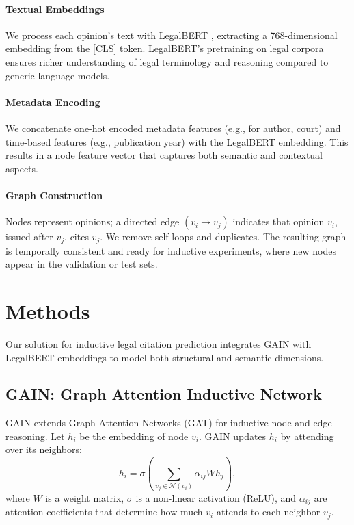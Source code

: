 \documentclass{article}
\begin{document}
\paragraph{Textual Embeddings}
We process each opinion’s text with LegalBERT \citep{chalkidis-etal-2020-legalbert}, extracting a 768-dimensional embedding from the [CLS] token. LegalBERT’s pretraining on legal corpora ensures richer understanding of legal terminology and reasoning compared to generic language models.

\paragraph{Metadata Encoding}
We concatenate one-hot encoded metadata features (e.g., for author, court) and time-based features (e.g., publication year) with the LegalBERT embedding. This results in a node feature vector that captures both semantic and contextual aspects.

\paragraph{Graph Construction}
Nodes represent opinions; a directed edge $(v_i \to v_j)$ indicates that opinion $v_i$, issued after $v_j$, cites $v_j$. We remove self-loops and duplicates. The resulting graph is temporally consistent and ready for inductive experiments, where new nodes appear in the validation or test sets.

\section{Methods}
Our solution for inductive legal citation prediction integrates GAIN \citep{weng2022gain} with LegalBERT embeddings to model both structural and semantic dimensions.

\subsection{GAIN: Graph Attention Inductive Network}
GAIN extends Graph Attention Networks (GAT) \citep{velivckovic2018graph} for inductive node and edge reasoning. Let $h_i$ be the embedding of node $v_i$. GAIN updates $h_i$ by attending over its neighbors:
\begin{equation}
h_i = \sigma\left(\sum_{v_j \in \mathcal{N}(v_i)} \alpha_{ij} W h_j \right),
\end{equation}
where $W$ is a weight matrix, $\sigma$ is a non-linear activation (ReLU), and $\alpha_{ij}$ are attention coefficients that determine how much $v_i$ attends to each neighbor $v_j$.
\end{document}
